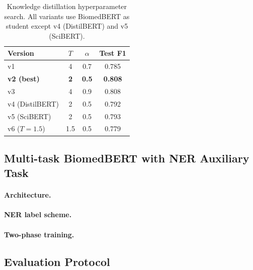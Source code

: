 \documentclass[12pt,a4paper]{article}
\begin{document}
\begin{table}[H]
\centering
\caption{Knowledge distillation hyperparameter search.
All variants use BiomedBERT as student except v4 (DistilBERT) and v5 (SciBERT).}
\label{tab:distillation}
\begin{tabular}{lccc}
\toprule
\textbf{Version} & $T$ & $\alpha$ & \textbf{Test F1} \\
\midrule
v1 & 4 & 0.7 & 0.785 \\
\rowcolor{bestrow}
\textbf{v2 (best)} & \textbf{2} & \textbf{0.5} & \textbf{0.808} \\
v3 & 4 & 0.9 & 0.808 \\
v4 (DistilBERT) & 2 & 0.5 & 0.792 \\
v5 (SciBERT) & 2 & 0.5 & 0.793 \\
v6 ($T=1.5$) & 1.5 & 0.5 & 0.779 \\
\bottomrule
\end{tabular}
\end{table}


\subsection{Multi-task BiomedBERT with NER Auxiliary Task}
\label{sec:multitask}

\paragraph{Architecture.}

\paragraph{NER label scheme.}

\paragraph{Two-phase training.}

\subsection{Evaluation Protocol}
\label{sec:eval}

\end{document}
